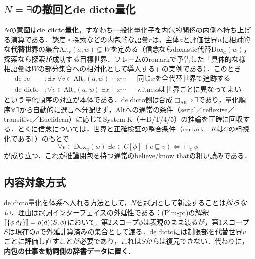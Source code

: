 \documentclass[../../main-detail.tex]{subfiles}
\begin{document}
\subsection{$N=\exists$の撤回とde dicto量化}
$N$の意図は\textbf{de dicto量化}，すなわち一般化量化子を内包的関係の内側へ持ち上げる演算である．態度・探索などの内包的な語彙$r$は，主体$a$と評価世界$w$に相対的な\textbf{代替世界}の集合$\mathrm{Alt}_r(a,w) \subseteq W$を定める（信念ならdoxastic代替$\mathrm{Dox}_a(w)$，探索なら探索が成功する目標世界．フレームのremarkで予告した「具体的な様相語彙は$W$の部分集合への相対化として導入する」の実例である）．このとき
\begin{align*}
    \text{de re} &: \exists x\;\forall v\in\mathrm{Alt}_r(a,w)\;\cdots x\cdots
    &&\text{同じ$x$を全代替世界で追跡する}\\
    \text{de dicto} &: \forall v\in\mathrm{Alt}_r(a,w)\;\exists x\;\cdots x\cdots
    &&\text{witnessは世界ごとに異なってよい}
\end{align*}
という量化順序の対立が本体である．de dicto側は合成$\Box_{\mathrm{Alt}}\circ\exists$であり，量化順序$\forall\exists$から自動的に選言へ分配せず，$\mathrm{Alt}$への通常の条件（serial／reflexive／transitive／Euclidean）に応じてSystem K（＋D/T/4/5）の推論を正確に回収する．とくに信念については，世界と正確検証の整合条件（remark［$K$は$C$の粗視化である］）のもとで
\[
    \forall v\in\mathrm{Dox}_a(w)\;\exists e\in C[\phi]\;(e\sqsubseteq v) \iff \Box_a\phi
\]
が成り立つ．これが推論閉包を持つ通常のbelieve/know thatの粗い読みである．

\subsection{内容対象方式}
de dicto量化を体系へ入れる方法として，$N$を冠詞として新設することは\emph{採らない}．理由は冠詞インターフェイスの外延性である：(Plm-pt)の解釈$\llbracket\{\phi\,d_I\}\rrbracket = \rho(d)(S,\phi)$において，第2スコープ$\phi$は表現のまま渡るが，第1スコープ$S$は現在の$\rho$で外延計算済みの集合として渡る．de dictoには制限部を代替世界$v$ごとに評価し直すことが必要であり，これは$S$からは復元できない．代わりに，\textbf{内包の仕事を動詞側の辞書データに置く}．
\end{document}
